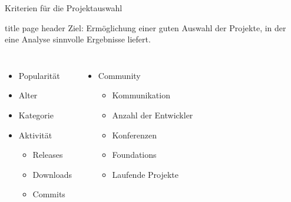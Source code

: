 \documentclass[11pt]{beamer}
\newlength{\colwidth}
\begin{document}
\begin{frame}{Kriterien für die Projektauswahl}
  \begin{beamercolorbox}[sep=1em]{title page header}
    Ziel: Ermöglichung einer guten Auswahl der Projekte, in der eine Analyse
    sinnvolle Ergebnisse liefert.
  \end{beamercolorbox}

  \begin{columns}[T]
  \column{\colwidth}
  \begin{itemize}
    \item Popularität
    \item Alter
    \item Kategorie
    \item Aktivität
    \begin{itemize}
      \item Releases
      \item Downloads
      \item Commits
    \end{itemize}
  \end{itemize}
  \column{\colwidth}
  \begin{itemize}
    \item Community
    \begin{itemize}
      \item Kommunikation
      \item Anzahl der Entwickler
      \item Konferenzen
      \item Foundations
      \item Laufende Projekte
    \end{itemize}
  \end{itemize}
  \end{columns}
\end{frame}
\end{document}
